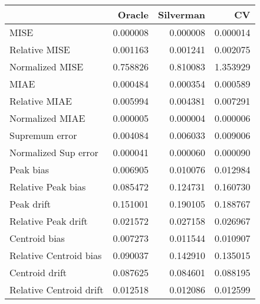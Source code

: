 \begin{tabular}{lrrr}
  \toprule
 & Oracle & Silverman & CV \\ 
  \midrule
MISE & 0.000008 & 0.000008 & 0.000014 \\ 
  Relative MISE & 0.001163 & 0.001241 & 0.002075 \\ 
  Normalized MISE & 0.758826 & 0.810083 & 1.353929 \\ 
  MIAE & 0.000484 & 0.000354 & 0.000589 \\ 
  Relative MIAE & 0.005994 & 0.004381 & 0.007291 \\ 
  Normalized MIAE & 0.000005 & 0.000004 & 0.000006 \\ 
  Supremum error & 0.004084 & 0.006033 & 0.009006 \\ 
  Normalized Sup error & 0.000041 & 0.000060 & 0.000090 \\ 
  Peak bias & 0.006905 & 0.010076 & 0.012984 \\ 
  Relative Peak bias & 0.085472 & 0.124731 & 0.160730 \\ 
  Peak drift & 0.151001 & 0.190105 & 0.188767 \\ 
  Relative Peak drift & 0.021572 & 0.027158 & 0.026967 \\ 
  Centroid bias & 0.007273 & 0.011544 & 0.010907 \\ 
  Relative Centroid bias & 0.090037 & 0.142910 & 0.135015 \\ 
  Centroid drift & 0.087625 & 0.084601 & 0.088195 \\ 
  Relative Centroid drift & 0.012518 & 0.012086 & 0.012599 \\ 
   \bottomrule
\end{tabular}
